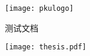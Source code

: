 \documentclass[fontset=pkufontauto,zihao=-4]{ctexart}
\newlength{\colpad}
\newcommand{\colwidth}{0.99\ccwd}
\newcommand{\miniwidth}{210mm}
\newcommand{\logowidth}{64mm}
\newcommand{\vertmargin}{\fill}
\begin{document}
\centering
\begin{minipage}[b][\textheight][b]{\miniwidth}
    \vspace*{\fill}\par
    \centerline{\texttt{[image: pkulogo]}}\par
    \vspace*{\fill}\par
\end{minipage}
\hspace{\colpad}
\begin{minipage}[b][\textheight][b]{\colwidth}
    \bfseries\linespread{1}\selectfont
    \vspace*{\vertmargin}\par
    测试文档\par\vfill
    \par\vfill{}\par
    \vspace*{\vertmargin}\par
\end{minipage}
\hspace{\colpad}
\begin{minipage}[b][\textheight][b]{\miniwidth}
    \texttt{[image: thesis.pdf]}
\end{minipage}
\end{document}
